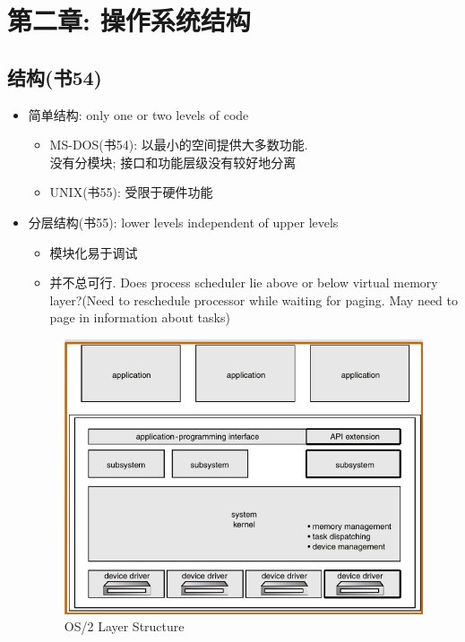 \documentclass[a4paper, UTF8]{article}
\begin{document}
\section{第二章: 操作系统结构}
\subsection{结构(书54)}
\begin{itemize}
\item 简单结构: only one or two levels of code
	\begin{itemize}
	\item MS-DOS(书54): 以最小的空间提供大多数功能.\\
		没有分模块; 接口和功能层级没有较好地分离
	\item UNIX(书55): 受限于硬件功能
	\end{itemize}
\item 分层结构(书55): lower levels independent of upper levels\\
	\begin{itemize}
	\item 模块化易于调试
	\item 并不总可行. Does process scheduler lie above or below virtual memory layer?(Need to reschedule processor while waiting for paging. May need to page in information about tasks)
	\end{itemize}
	\begin{figure}[H]
		\centering
		\includegraphics[width=\linewidth/2]{OS2_Layer_Structure.png}
		\caption{OS/2 Layer Structure}
	\end{figure}\par

\end{itemize}
\end{document}
